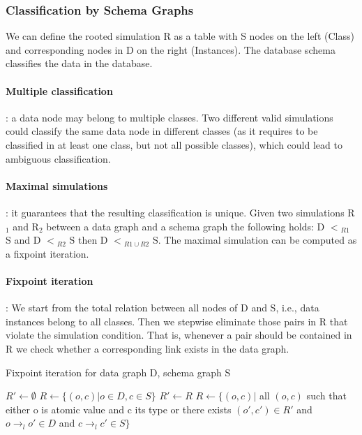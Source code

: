\subsubsection{Classification by Schema Graphs}
We can define the rooted simulation R as a table with S nodes on the left (Class) and corresponding nodes in D on the right (Instances). The database schema classifies the data in the database.

\paragraph{Multiple classification}: a data node may belong to multiple classes. Two different valid simulations could classify the same data node in different classes (as it requires to be classified in at least one class, but not all possible classes), which could lead to ambiguous classification.

\paragraph{Maximal simulations}: it guarantees that the resulting classification is unique. Given two simulations R$_{1}$ and R$_{2}$ between a data graph and a schema graph the following holds: D $<$$_{R1}$ S and D $<$$_{R2}$ S then  D $<$$_{R1 \cup R2}$ S. The maximal simulation can be computed as a fixpoint iteration. 

\paragraph{Fixpoint iteration}: We start from the total relation between all nodes of D and S, i.e., data instances belong to all classes. Then we stepwise eliminate those pairs in R that violate the simulation condition. That is, whenever a pair should be contained in R we check whether a corresponding link exists in the data graph.
\begin{algorithm}
\caption{Fixpoint iteration for data graph D, schema graph S}
\begin{algorithmic} 
\STATE $R' \leftarrow \emptyset$
\STATE $R \leftarrow \{ (o, c) | o \in D, c \in S \}$
\STATE $R' \leftarrow R$
\STATE $R \leftarrow  \{ (o, c) |$ all $(o, c)$ such that either o is atomic value and c its type or there exists $(o', c') \in R'$ and $o \rightarrow _{l} o' \in D$ and $c \rightarrow _{l} c' \in S \}$
\ENDWHILE
\end{algorithmic}
\end{algorithm}

